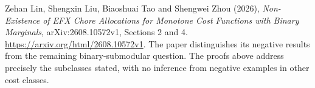 \documentclass[11pt,a4paper]{article}
\theoremstyle{definition}
\theoremstyle{remark}
\begin{document}
Zehan Lin, Shengxin Liu, Biaoshuai Tao and Shengwei Zhou (2026), \emph{Non-Existence of EFX Chore Allocations for Monotone Cost Functions with Binary Marginals}, arXiv:2608.10572v1, Sections 2 and 4. \url{https://arxiv.org/html/2608.10572v1}. The paper distinguishes its negative results from the remaining binary-submodular question. The proofs above address precisely the subclasses stated, with no inference from negative examples in other cost classes.
\end{document}
